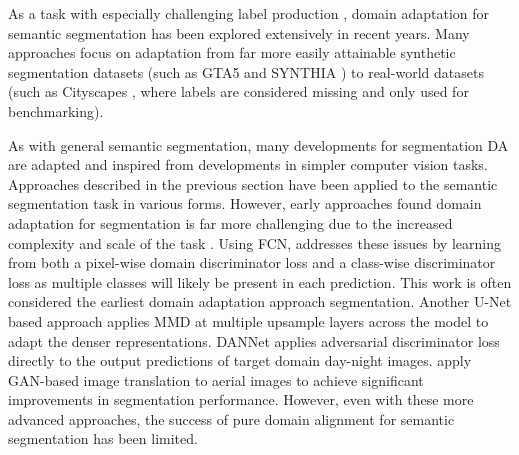 \documentclass[a4paper,12pt]{report}
\begin{document}
    As a task with especially challenging label production \cite{cordts_cityscapes_2016}, domain adaptation for semantic segmentation has been explored extensively in recent years. Many approaches focus on adaptation from far more easily attainable synthetic segmentation datasets (such as GTA5 \cite{richter_playing_2016} and SYNTHIA \cite{ros_synthia_2016}) to real-world datasets (such as Cityscapes \cite{cordts_cityscapes_2016}, where labels are considered missing and only used for benchmarking).
    
    As with general semantic segmentation, many developments for segmentation DA are adapted and inspired from developments in simpler computer vision tasks. Approaches described in the previous section have been applied to the semantic segmentation task in various forms. However, early approaches found domain adaptation for segmentation is far more challenging due to the increased complexity and scale of the task \cite{csurka_unsupervised_2021}. Using FCN, \cite{hoffman_fcns_2016} addresses these issues by learning from both a pixel-wise domain discriminator loss and a class-wise discriminator loss as multiple classes will likely be present in each prediction. This work is often considered the earliest domain adaptation approach segmentation. Another U-Net \cite{ronneberger_u-net_2015} based approach \cite{bermudez-chacon_domain-adaptive_2018} applies MMD at multiple upsample layers across the model to adapt the denser representations. DANNet \cite{wu_dannet_2021} applies adversarial discriminator loss directly to the output predictions of target domain day-night images. \cite{benjdira_unsupervised_2019} apply GAN-based image translation to aerial images to achieve significant improvements in segmentation performance. However, even with these more advanced approaches, the success of pure domain alignment for semantic segmentation has been limited.
    
\end{document}
